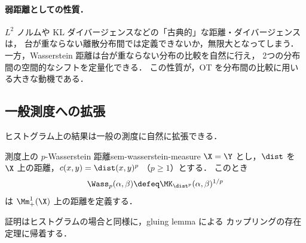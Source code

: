 \paragraph{弱距離としての性質．}
$L^2$ ノルムや KL ダイバージェンスなどの「古典的」な距離・ダイバージェンスは，
台が重ならない離散分布間では定義できないか，無限大となってしまう．
一方，Wasserstein 距離は台が重ならない分布の比較を自然に行え，
2つの分布間の空間的なシフトを定量化できる．
この性質が，OT を分布間の比較に用いる大きな動機である．

\subsection{一般測度への拡張}

ヒストグラム上の結果は一般の測度に自然に拡張できる．

\begin{proposition}{測度上の $p$-Wasserstein 距離}{sem-wasserstein-measure}
  $\X = \Y$ とし，$\dist$ を $\X$ 上の距離，$c(x,y) = \dist(x,y)^p$ （$p \geq 1$）とする．
  このとき
  \[
    \Wass_p(\alpha, \beta)
    \defeq \MK_{\dist^p}(\alpha, \beta)^{1/p}
  \]
  は $\Mm_+^1(\X)$ 上の距離を定義する．
\end{proposition}

証明はヒストグラムの場合と同様に，gluing lemma による
カップリングの存在定理に帰着する．
